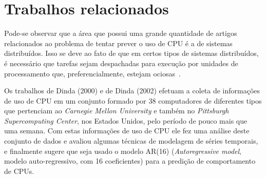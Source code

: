 %
%

\chapter{Trabalhos relacionados}

Pode-se observar que a área que possui uma grande quantidade de artigos
relacionados ao problema de tentar prever o uso de CPU é a de sistemas
distribuídos. Isso se deve ao fato de que em certos tipos de sistemas
distribuídos, é necessário que tarefas sejam despachadas para execução por
unidades de processamento que, preferencialmente, estejam ociosas~\cite{zhang2007cpu}.

Os trabalhos de Dinda (2000)\nocite{dinda2000host} e de Dinda
(2002)\nocite{dinda2002evaluation} efetuam a coleta de informações de uso de
CPU em um conjunto formado por 38 computadores de diferentes tipos que
pertenciam ao \emph{Carnegie Mellon University} e também no \emph{Pittsburgh
Supercomputing Center}, nos Estados Unidos, pelo período de pouco mais que uma
semana. Com estas informações de uso de CPU ele fez uma análise deste conjunto
de dados e avaliou algumas técnicas de modelagem de séries temporais, e
finalmente sugere que seja usado o modelo AR(16) (\emph{Autoregressive model},
modelo auto-regressivo, com 16 coeficientes) para a predição de comportamento
de CPUs. 


